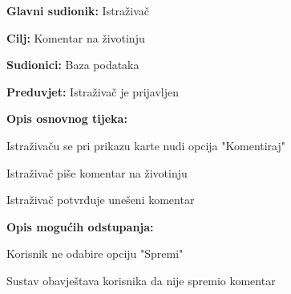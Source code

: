 				\noindent {}
				\begin{packed_item}
					
					\item \textbf{Glavni sudionik:} Istraživač
					\item  \textbf{Cilj:} Komentar na životinju
					\item  \textbf{Sudionici:} Baza podataka
					\item  \textbf{Preduvjet:} Istraživač je prijavljen
					\item  \textbf{Opis osnovnog tijeka:}
					
					\item[] \begin{packed_enum}
						
						\item Istraživaču se pri prikazu karte nudi opcija "Komentiraj"
					
						\item Istraživač piše komentar na životinju
						\item Istraživač potvrđuje unešeni komentar
						
						
					\end{packed_enum}
					
					\item  \textbf{Opis mogućih odstupanja:}
				
				\item[] \begin{packed_item}
					
					\item[4.a]Korisnik ne odabire opciju "Spremi"
					\item[] \begin{packed_enum}
						
						\item Sustav obavještava korisnika da nije spremio komentar
						
					\end{packed_enum}
					
				\end{packed_item}
						
				\end{packed_item}
				
					
				
